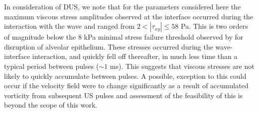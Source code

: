 In consideration of \ac{DUS}, we note that for the parameters
considered here the maximum viscous stress amplitudes observed at the
interface occurred during the interaction with the wave and ranged
from $2 < \left|\tau_{xy}\right| \leq 58$ Pa. This is two orders of
magnitude below the $8$ kPa minimal stress failure threshold observed
by \cite{West1991} for disruption of alveolar epithelium. These
stresses occurred during the wave-interface interaction, and quickly
fell off thereafter, in much less time than a typical period between
pulses ($\sim 1$ ms). This suggests that viscous stresses are not
likely to quickly accumulate between pulses. A possible, exception to
this could occur if the velocity field were to change significantly as
a result of accumulated vorticity from subsequent \ac{US} pulses and
assessment of the feasibility of this is beyond the scope of this
work.
%
%
